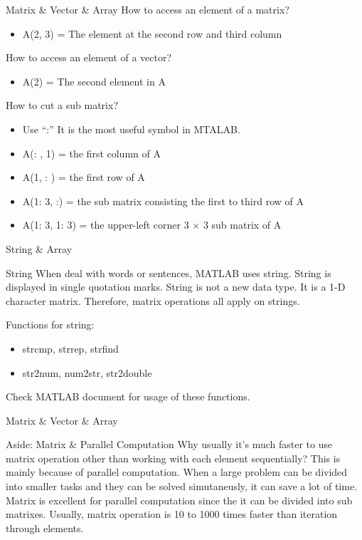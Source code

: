 \begin{frame}{Matrix \& Vector \& Array}
How to access an element of a matrix?
\begin{itemize}
\item A(2, 3) = The element at the second row and third column
\end{itemize}
How to access an element of a vector?
\begin{itemize}
\item A(2) = The second element in A
\end{itemize}
How to cut a sub matrix?
\begin{itemize}
\item Use ``:''  It is the most useful symbol in MTALAB.
\item A(: , 1) = the first column of A
\item A(1, : ) = the first row of A
\item A(1: 3, :) = the sub matrix consisting the first to third row of A
\item A(1: 3, 1: 3) = the upper-left corner 3 $\times$ 3 sub matrix of A
\end{itemize}
\end{frame}

\begin{frame}{String \& Array}
\begin{block}{String}
When deal with words or sentences, MATLAB uses string. String is displayed in single quotation marks. String is not a new data type. It is a 1-D character matrix. Therefore, matrix operations all apply on strings.
\end{block}
Functions for string:
\begin{itemize}
\item strcmp, strrep, strfind
\item str2num, num2str, str2double
\end{itemize}
Check MATLAB document for usage of these functions.
\end{frame}

\begin{frame}{Matrix \& Vector \& Array}
\begin{block}{Aside: Matrix \& Parallel Computation\footnotemark}
Why usually it's much faster to use matrix operation other than working with each element sequentially? This is mainly because of parallel computation. When a large problem can be divided into smaller tasks and they can be solved simutaneusly, it can save a lot of time. Matrix is excellent for parallel computation since the it can be divided into sub matrixes. Usually, matrix operation is 10 to 1000 times faster than iteration through elements.
\end{block}
\end{frame}

